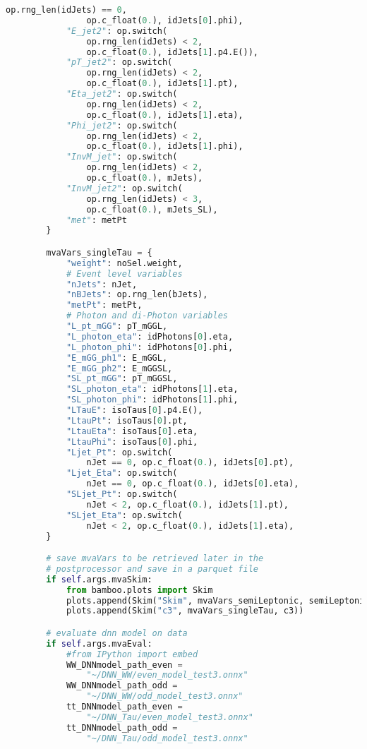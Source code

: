 \begin{lstlisting}[language=Python, caption=Python module of the analysis used in Bamboo framework, label={bamboocode}]
                op.rng_len(idJets) == 0,
                op.c_float(0.), idJets[0].phi),
            "E_jet2": op.switch(
                op.rng_len(idJets) < 2,
                op.c_float(0.), idJets[1].p4.E()),
            "pT_jet2": op.switch(
                op.rng_len(idJets) < 2,
                op.c_float(0.), idJets[1].pt),
            "Eta_jet2": op.switch(
                op.rng_len(idJets) < 2,
                op.c_float(0.), idJets[1].eta),
            "Phi_jet2": op.switch(
                op.rng_len(idJets) < 2,
                op.c_float(0.), idJets[1].phi),
            "InvM_jet": op.switch(
                op.rng_len(idJets) < 2,
                op.c_float(0.), mJets),
            "InvM_jet2": op.switch(
                op.rng_len(idJets) < 3,
                op.c_float(0.), mJets_SL),
            "met": metPt
        }

        mvaVars_singleTau = {
            "weight": noSel.weight,
            # Event level variables
            "nJets": nJet,
            "nBJets": op.rng_len(bJets),
            "metPt": metPt,
            # Photon and di-Photon variables
            "L_pt_mGG": pT_mGGL,
            "L_photon_eta": idPhotons[0].eta,
            "L_photon_phi": idPhotons[0].phi,
            "E_mGG_ph1": E_mGGL,
            "E_mGG_ph2": E_mGGSL,
            "SL_pt_mGG": pT_mGGSL,
            "SL_photon_eta": idPhotons[1].eta,
            "SL_photon_phi": idPhotons[1].phi,
            "LTauE": isoTaus[0].p4.E(),
            "LtauPt": isoTaus[0].pt,
            "LtauEta": isoTaus[0].eta,
            "LtauPhi": isoTaus[0].phi,
            "Ljet_Pt": op.switch(
                nJet == 0, op.c_float(0.), idJets[0].pt),
            "Ljet_Eta": op.switch(
                nJet == 0, op.c_float(0.), idJets[0].eta),
            "SLjet_Pt": op.switch(
                nJet < 2, op.c_float(0.), idJets[1].pt),
            "SLjet_Eta": op.switch(
                nJet < 2, op.c_float(0.), idJets[1].eta),
        }

        # save mvaVars to be retrieved later in the
        # postprocessor and save in a parquet file
        if self.args.mvaSkim:
            from bamboo.plots import Skim
            plots.append(Skim("Skim", mvaVars_semiLeptonic, semiLeptonic))
            plots.append(Skim("c3", mvaVars_singleTau, c3))

        # evaluate dnn model on data
        if self.args.mvaEval:
            #from IPython import embed
            WW_DNNmodel_path_even = 
                "~/DNN_WW/even_model_test3.onnx"
            WW_DNNmodel_path_odd = 
                "~/DNN_WW/odd_model_test3.onnx"
            tt_DNNmodel_path_even = 
                "~/DNN_Tau/even_model_test3.onnx"
            tt_DNNmodel_path_odd = 
                "~/DNN_Tau/odd_model_test3.onnx"


\end{lstlisting}
